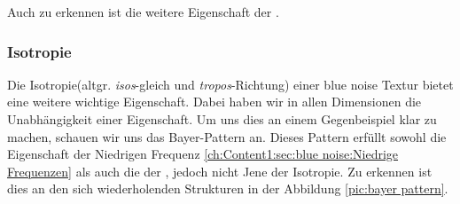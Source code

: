 Auch zu erkennen ist die weitere Eigenschaft der .

\subsubsection{Isotropie}
\label{ch:Content1:sec:blue noise:Isotropie}

Die Isotropie(altgr. \textit{isos}-gleich und \textit{tropos}-Richtung)
einer blue noise Textur bietet eine weitere wichtige Eigenschaft. Dabei haben wir in allen Dimensionen
die Unabhängigkeit einer Eigenschaft. Um uns dies an einem Gegenbeispiel 
klar zu machen, schauen wir uns das Bayer-Pattern an. Dieses Pattern erfüllt sowohl 
die Eigenschaft der Niedrigen Frequenz \ref{ch:Content1:sec:blue noise:Niedrige Frequenzen} als auch 
die der , jedoch nicht Jene der Isotropie.
Zu erkennen ist dies an den sich wiederholenden Strukturen in der Abbildung \ref{pic:bayer pattern}.

